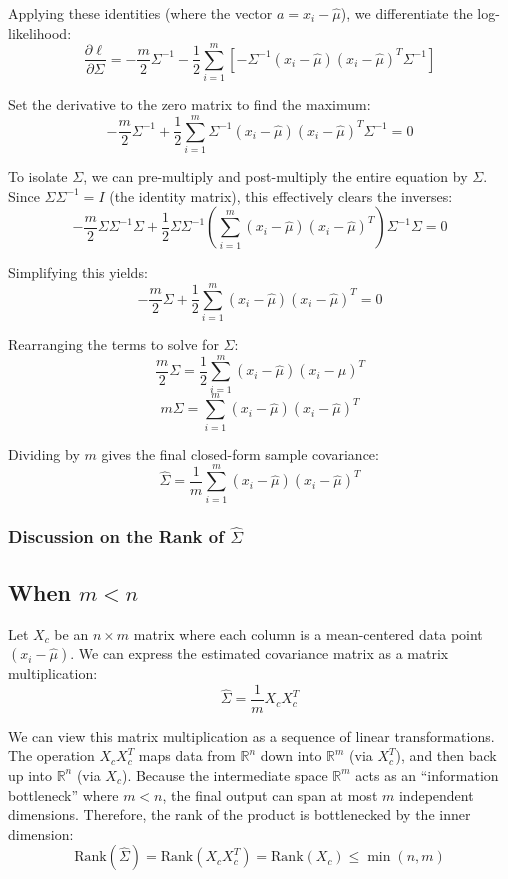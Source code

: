 \documentclass[twoside, 10pt]{article}
\begin{document}
Applying these identities (where the vector $a = x_i - \hat{\mu}$), we differentiate the log-likelihood:
\[
\frac{\partial \ell}{\partial \Sigma} = -\frac{m}{2}\Sigma^{-1} - \frac{1}{2}\sum_{i=1}^m \left[-\Sigma^{-1}(x_i - \hat{\mu})(x_i - \hat{\mu})^T\Sigma^{-1}\right]
\]

Set the derivative to the zero matrix to find the maximum:
\[
-\frac{m}{2}\Sigma^{-1} + \frac{1}{2}\sum_{i=1}^m \Sigma^{-1}(x_i - \hat{\mu})(x_i - \hat{\mu})^T\Sigma^{-1} = 0
\]

To isolate $\Sigma$, we can pre-multiply and post-multiply the entire equation by $\Sigma$. Since $\Sigma \Sigma^{-1} = I$ (the identity matrix), this effectively clears the inverses:
\[
-\frac{m}{2}\Sigma \Sigma^{-1} \Sigma + \frac{1}{2} \Sigma \Sigma^{-1} \left( \sum_{i=1}^m (x_i - \hat{\mu})(x_i - \hat{\mu})^T \right) \Sigma^{-1} \Sigma = 0
\]

Simplifying this yields:
\[
-\frac{m}{2}\Sigma + \frac{1}{2}\sum_{i=1}^m (x_i - \hat{\mu})(x_i - \hat{\mu})^T = 0
\]

Rearranging the terms to solve for $\Sigma$:
\[
\frac{m}{2}\Sigma = \frac{1}{2}\sum_{i=1}^m (x_i - \hat{\mu})(x_i - \hat{\mu})^T
\]
\[
m\Sigma = \sum_{i=1}^m (x_i - \hat{\mu})(x_i - \hat{\mu})^T
\]

Dividing by $m$ gives the final closed-form sample covariance:
\[
\hat{\Sigma} = \frac{1}{m}\sum_{i=1}^m \left(x_i - \hat{\mu}\right){\left(x_i - \hat{\mu}\right)}^T
\]


\subsubsection{Discussion on the Rank of $\hat{\Sigma}$}

\subsection*{When $m < n$}
Let $X_c$ be an $n \times m$ matrix where each column is a mean-centered data point $(x_i - \hat{\mu})$. We can express the estimated covariance matrix as a matrix multiplication:
\[\hat{\Sigma} = \frac{1}{m} X_c X_c^T\]

We can view this matrix multiplication as a sequence of linear transformations. The operation $X_c X_c^T$ maps data from $\mathbb{R}^n$ down into $\mathbb{R}^m$ (via $X_c^T$), and then back up into $\mathbb{R}^n$ (via $X_c$). Because the intermediate space $\mathbb{R}^m$ acts as an ``information bottleneck'' where $m < n$, the final output can span at most $m$ independent dimensions. Therefore, the rank of the product is bottlenecked by the inner dimension:
\[\text{Rank}(\hat{\Sigma}) = \text{Rank}(X_c X_c^T) = \text{Rank}(X_c) \leq \min(n, m)\]
\end{document}
